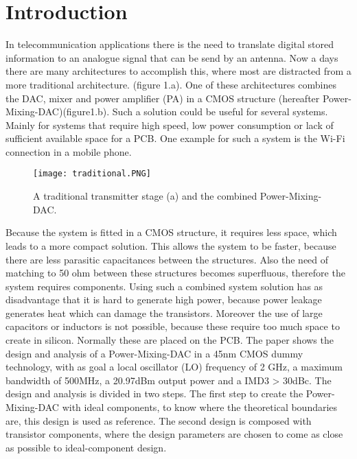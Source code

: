 \section{Introduction} \label{sec:introduction}
In telecommunication applications there is the need to translate digital stored information to an analogue signal that can be send by an antenna. Now a days there are many architectures to accomplish this, where most are distracted from a more traditional architecture. (figure 1.a). One of these architectures combines the DAC, mixer and power amplifier (PA) in a CMOS structure (hereafter Power-Mixing-DAC)(figure1.b). Such a solution could be useful for several systems. Mainly for systems that require high speed, low power consumption or lack of sufficient available space for a PCB. One example for such a system is the Wi-Fi connection in a mobile phone.
\begin{figure}[h]
\texttt{[image: traditional.PNG]}
\caption{A traditional transmitter stage (a) and the combined Power-Mixing-DAC.}
\label{fig:traditional}
\end{figure}
Because the system is fitted in a CMOS structure, it requires less space, which leads to a more compact solution. This allows the system to be faster, because there are less parasitic capacitances between the structures. Also the need of matching to 50 ohm between these structures becomes superfluous, therefore the system requires components. Using such a combined system solution has as disadvantage that it is hard to generate high power, because power leakage generates heat which can damage the transistors. Moreover the use of large capacitors or inductors is not possible, because these require too much space to create in silicon. Normally these are placed on the PCB.
The paper shows the design and analysis of a Power-Mixing-DAC in a 45nm CMOS dummy technology, with as goal a local oscillator (LO) frequency of 2 GHz, a maximum bandwidth of 500MHz, a 20.97dBm output power and a IMD3 > 30dBc. The design and analysis is divided in two steps. The first step to create the Power-Mixing-DAC with ideal components, to know where the theoretical boundaries are, this design is used as reference. The second design is composed with transistor components, where the design parameters are chosen to come as close as possible to ideal-component design.  



